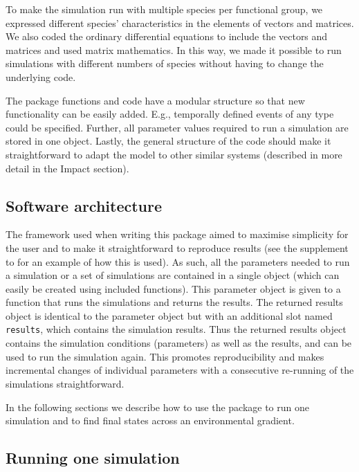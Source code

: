 \documentclass[]{elsarticle} %
\begin{document}
To make the simulation run with multiple species per functional group, we expressed different species' characteristics in the elements of vectors and matrices. We also coded the ordinary differential equations to include the vectors and matrices and used matrix mathematics. In this way, we made it possible to run simulations with different numbers of species without having to change the underlying code.

The package functions and code have a modular structure so that new functionality can be easily added. E.g., temporally defined events of any type could be specified. Further, all parameter values required to run a simulation are stored in one object. Lastly, the general structure of the code should make it straightforward to adapt the model to other similar systems (described in more detail in the Impact section).

\hypertarget{software-architecture}{%
\subsection{Software architecture}\label{software-architecture}}

The framework used when writing this package aimed to maximise simplicity for the user and to make it straightforward to reproduce results (see the supplement \citep{Petchey2022} to \citet{Limberger2023} for an example of how this is used). As such, all the parameters needed to run a simulation or a set of simulations are contained in a single object (which can easily be created using included functions). This parameter object is given to a function that runs the simulations and returns the results. The returned results object is identical to the parameter object but with an additional slot named \texttt{results}, which contains the simulation results. Thus the returned results object contains the simulation conditions (parameters) as well as the results, and can be used to run the simulation again. This promotes reproducibility and makes incremental changes of individual parameters with a consecutive re-running of the simulations straightforward.

In the following sections we describe how to use the package to run one simulation and to find final states across an environmental gradient.

\hypertarget{running-one-simulation}{%
\subsection{Running one simulation}\label{running-one-simulation}}
\end{document}
